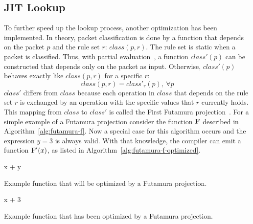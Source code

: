 \documentclass[a4paper,
		12pt,
		parskip=full,
		titlepage
		]{scrartcl}
\begin{document}
\subsection{JIT Lookup}
To further speed up the lookup process, another optimization has been implemented.
In theory, packet classification is done by a function that depends on the packet $p$ and the rule set $r$: $class(p, r)$.
The rule set is static when a packet is classified.
Thus, with partial evaluation~\cite{partial_eval}, a function $class'(p)$ can be constructed that depends only on the packet as input.
Otherwise, $class'(p)$ behaves exactly like $class(p, r)$ for a specific $r$:
$$class(p, r) = class'_r(p),\ \forall p$$
$class'$ differs from $class$ because each operation in $class$ that depends on the 
rule set $r$ is exchanged by an operation with the specific values that $r$ currently holds.
This mapping from $class$ to $class'$ is called the First Futamura projection~\cite{DBLP:journals/ngc/MogensenH88}.
For a simple example of a Futamura projection consider the function $\textsc{F}$ described in Algorithm~\ref{alg:futamura-f}.
Now a special case for this algorithm occurs and the expression $y = 3$ is always valid.
With that knowledge, the compiler can emit a function $\textsc{F}'(x)$, as listed in Algorithm~\ref{alg:futamura-f-optimized}.

\begin{algorithm}
\begin{algorithmic}[1]
    \State \Return x + y
\EndFunction
\end{algorithmic}
\caption{Example function that will be optimized by a Futamura projection.}
\label{alg:futamura-f}
\end{algorithm}

\begin{algorithm}
\begin{algorithmic}[1]
    \State \Return x + 3
\EndFunction
\end{algorithmic}
\caption{Example function that has been optimized by a Futamura projection.}
\label{alg:futamura-f-optimized}
\end{algorithm}
\end{document}
